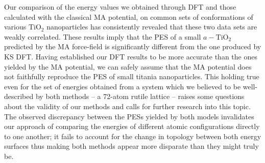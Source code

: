 \documentclass[aps,prb,twocolumn,amsmath,amssymb,superscriptaddress,longbibliography]{revtex4-1}
\newcommand\tab[1][1cm]{\hspace*{#1}} %
\begin{document}
\tab Our comparison of the energy values we obtained through DFT and those calculated with the classical MA potential, on common sets of conformations of various $\text{TiO}_2$ nanoparticles has consistently revealed that these two data sets are weakly correlated.
These results imply that the PES of a small $a-\text{TiO}_2$ predicted by the MA force-field is significantly different from the one produced by KS DFT.
Having established our DFT results to be more accurate than the ones yielded by the MA potential, we can safely assume that the MA potential does not faithfully reproduce the PES of small titania nanoparticles.
This holding true even for the set of energies obtained from a system which we believed to be well-described by both methods -- a 72-atom rutile lattice -- raises some questions about the validity of our methods and calls for further research into this topic.
The observed discrepancy between the PESs yielded by both models invalidates our approach of comparing the energies of different atomic configurations directly to one another; it fails to account for the change in topology between both energy surfaces thus making both methods appear more disparate than they might truly be.


\end{document}
